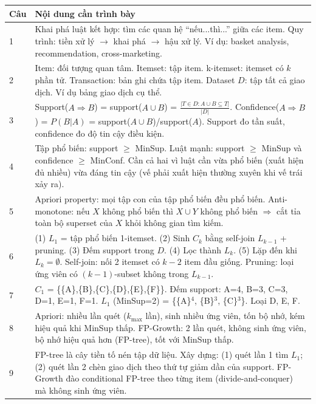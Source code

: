 \documentclass[10pt]{article}
\begin{document}
\begin{singlespace}
\begin{longtable}{|p{}|p{}|}
\hline
\textbf{Câu} & \textbf{Nội dung cần trình bày} \\
\hline
\endhead
1 & Khai phá luật kết hợp: tìm các quan hệ ``nếu...thì...'' giữa các item. Quy trình: tiền xử lý $\to$ khai phá $\to$ hậu xử lý. Ví dụ: basket analysis, recommendation, cross-marketing. \\
\hline
2 & Item: đối tượng quan tâm. Itemset: tập item. k-itemset: itemset có $k$ phần tử. Transaction: bản ghi chứa tập item. Dataset $D$: tập tất cả giao dịch. Ví dụ bảng giao dịch cụ thể. \\
\hline
3 & Support($A \Rightarrow B$) = support($A \cup B$) = $\frac{|T \in D: A \cup B \subseteq T|}{|D|}$. Confidence($A \Rightarrow B$) = $P(B|A)$ = support($A \cup B$)/support($A$). Support đo tần suất, confidence đo độ tin cậy điều kiện. \\
\hline
4 & Tập phổ biến: support $\geq$ MinSup. Luật mạnh: support $\geq$ MinSup và confidence $\geq$ MinConf. Cần cả hai vì luật cần vừa phổ biến (xuất hiện đủ nhiều) vừa đáng tin cậy (vế phải xuất hiện thường xuyên khi vế trái xảy ra). \\
\hline
5 & Apriori property: mọi tập con của tập phổ biến đều phổ biến. Anti-monotone: nếu $X$ không phổ biến thì $X \cup Y$ không phổ biến $\Rightarrow$ cắt tỉa toàn bộ superset của $X$ khỏi không gian tìm kiếm. \\
\hline
6 & (1) $L_1$ = tập phổ biến 1-itemset. (2) Sinh $C_k$ bằng self-join $L_{k-1}$ + pruning. (3) Đếm support trong $D$. (4) Lọc thành $L_k$. (5) Lặp đến khi $L_k = \emptyset$. Self-join: nối 2 itemset có $k-2$ item đầu giống. Pruning: loại ứng viên có $(k-1)$-subset không trong $L_{k-1}$. \\
\hline
7 & $C_1$ = \{\{A\},\{B\},\{C\},\{D\},\{E\},\{F\}\}. Đếm support: A=4, B=3, C=3, D=1, E=1, F=1. $L_1$ (MinSup=2) = \{\{A\}$^4$, \{B\}$^3$, \{C\}$^3$\}. Loại D, E, F. \\
\hline
8 & Apriori: nhiều lần quét ($k_{\max}$ lần), sinh nhiều ứng viên, tốn bộ nhớ, kém hiệu quả khi MinSup thấp. FP-Growth: 2 lần quét, không sinh ứng viên, bộ nhớ hiệu quả hơn (FP-tree), tốt với MinSup thấp. \\
\hline
9 & FP-tree là cây tiền tố nén tập dữ liệu. Xây dựng: (1) quét lần 1 tìm $L_1$; (2) quét lần 2 chèn giao dịch theo thứ tự giảm dần của support. FP-Growth đào conditional FP-tree theo từng item (divide-and-conquer) mà không sinh ứng viên. \\

\end{longtable}
\end{singlespace}
\end{document}
